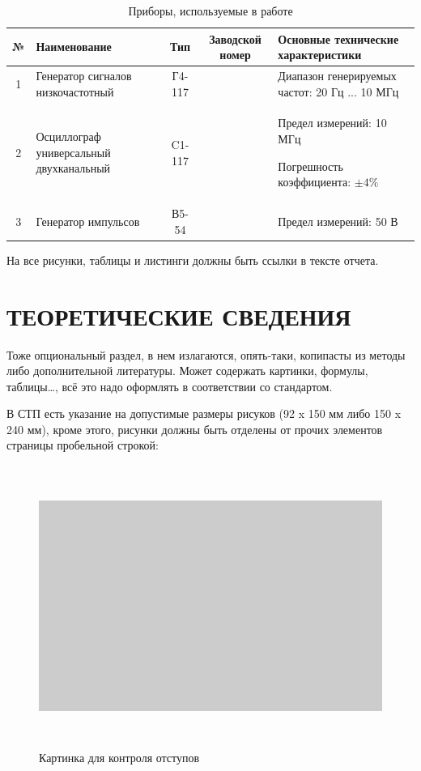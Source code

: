 \documentclass[a4paper,hidelinks,14pt]{extarticle}
\begin{document}
\begin{table}[h!]
	\caption{Приборы, используемые в работе}
	\renewcommand{\tabcolsep}{0.7em}
	\begin{tabularx}{\textwidth}{| c | X | c | c | X |} %
		\hline
		№ &  Наименование & Тип & Заводской номер & Основные технические характеристики \\ \hline

		1 & Генератор сигналов низкочастотный & Г4-117 & &
		Диапазон генерируемых частот: 20 Гц $ ... $ 10 МГц \\ \hline

		2 & Осциллограф универсальный двухканальный & C1-117 & &
		Предел измерений: 10 МГц \par
		Погрешность коэффициента: $ \pm4 \% $ \\ \hline

		3 & Генератор импульсов & В5-54 & &
		Предел измерений: 50 В \\ \hline
	\end{tabularx}
\end{table}

На все рисунки, таблицы и листинги должны быть ссылки в тексте отчета.

\newpage

\section{ТЕОРЕТИЧЕСКИЕ СВЕДЕНИЯ}

Тоже опциональный раздел, в нем излагаются, опять-таки, копипасты из методы либо
дополнительной литературы.
Может содержать картинки, формулы, таблицы\dots, всё это надо оформлять
в соответствии со стандартом.

В СТП есть указание на допустимые размеры рисуков (92 x 150 мм либо 150 x 240 мм),
кроме этого, рисунки должны быть отделены от прочих элементов страницы пробельной строкой:

\begin{figure}[htbp]
	\centering
	\includegraphics[width=150mm,height=92mm]{fig/scheme_p}
	\caption{Картинка для контроля отступов}
\end{figure}
\end{document}
